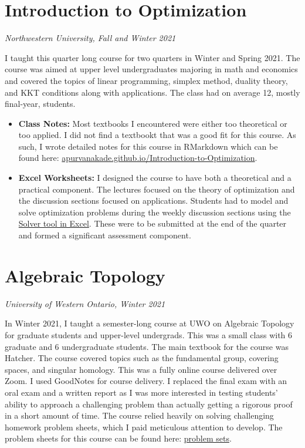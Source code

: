\documentclass[
]{report}
\begin{document}
\hypertarget{introduction-to-optimization}{%
\section{Introduction to Optimization}\label{introduction-to-optimization}}

\emph{Northwestern University, Fall and Winter 2021}

I taught this quarter long course for two quarters in Winter and Spring 2021. The course was aimed at upper level undergraduates majoring in math and economics and covered the topics of linear programming, simplex method, duality theory, and KKT conditions along with applications. The class had on average 12, mostly final-year, students.

\begin{itemize}
\item
  \textbf{Class Notes:}
  Most textbooks I encountered were either too theoretical or too applied. I did not find a textbookt that was a good fit for this course. As such, I wrote detailed notes for this course in RMarkdown which can be found here: \href{https://apurvanakade.github.io/Introduction-to-Optimization/}{apurvanakade.github.io/Introduction-to-Optimization}.
\item
  \textbf{Excel Worksheets:}
  I designed the course to have both a theoretical and a practical component. The lectures focused on the theory of optimization and the discussion sections focused on applications. Students had to model and solve optimization problems during the weekly discussion sections using the \href{https://support.microsoft.com/en-us/office/load-the-solver-add-in-in-excel-612926fc-d53b-46b4-872c-e24772f078ca}{Solver tool in Excel}. These were to be submitted at the end of the quarter and formed a significant assessment component.
\end{itemize}

\hypertarget{algebraic-topology}{%
\section{Algebraic Topology}\label{algebraic-topology}}

\emph{University of Western Ontario, Winter 2021}

In Winter 2021, I taught a semester-long course at UWO on Algebraic Topology for graduate students and upper-level undergrads. This was a small class with 6 graduate and 6 undergraduate students. The main textbook for the course was Hatcher. The course covered topics such as the fundamental group, covering spaces, and singular homology. This was a fully online course delivered over Zoom. I used GoodNotes for course delivery. I replaced the final exam with an oral exam and a written report as I was more interested in testing students' ability to approach a challenging problem than actually getting a rigorous proof in a short amount of time. The course relied heavily on solving challenging homework problem sheets, which I paid meticulous attention to develop. The problem sheets for this course can be found here: \href{https://github.com/apurvnakade/uwo2021-algebraic-topology/tree/main/output}{problem sets}.
\end{document}
